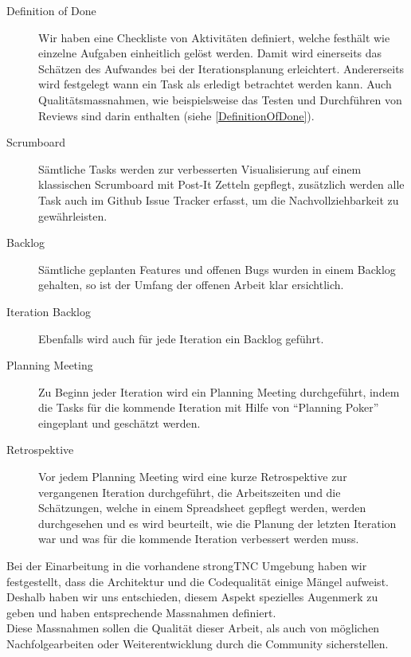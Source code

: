 \begin{description}
	\item[Definition of Done] Wir haben eine Checkliste von Aktivitäten	definiert,
	welche festhält wie einzelne Aufgaben einheitlich gelöst werden. Damit wird
	einerseits das Schätzen des Aufwandes bei der Iterationsplanung erleichtert.
	Andererseits wird festgelegt wann ein Task als erledigt betrachtet werden kann.
	Auch Qualitätsmassnahmen, wie beispielsweise das Testen und Durchführen von
	Reviews sind darin enthalten (siehe \autoref{DefinitionOfDone}).

	\item[Scrumboard] Sämtliche Tasks werden zur verbesserten Visualisierung auf
	einem klassischen Scrumboard mit Post-It Zetteln gepflegt, zusätzlich werden
	alle Task auch im Github Issue Tracker erfasst, um die Nachvollziehbarkeit
	zu gewährleisten.
	
	\item[Backlog] Sämtliche geplanten Features und offenen Bugs wurden in einem
	Backlog gehalten, so ist der Umfang der offenen Arbeit klar ersichtlich.
	
	\item[Iteration Backlog] Ebenfalls wird auch für jede Iteration ein Backlog
	geführt.
	
	\item[Planning Meeting] Zu Beginn jeder Iteration wird ein Planning Meeting
	durchgeführt, indem die Tasks für die kommende Iteration mit Hilfe von
	\enquote{Planning Poker} eingeplant und geschätzt werden.
		
	\item[Retrospektive] Vor jedem Planning Meeting wird eine kurze Retrospektive
	zur vergangenen Iteration durchgeführt, die Arbeitszeiten und die Schätzungen,
	welche in einem Spreadsheet gepflegt werden, werden durchgesehen und es wird
	beurteilt, wie die Planung der letzten Iteration war und was für die kommende
	Iteration verbessert werden muss.
	
\end{description}

Bei der Einarbeitung in die vorhandene strongTNC Umgebung haben wir
festgestellt, dass die Architektur und die Codequalität einige Mängel aufweist.
Deshalb haben wir uns entschieden, diesem Aspekt spezielles Augenmerk zu geben
und haben entsprechende Massnahmen definiert.\\ 
Diese Massnahmen sollen die Qualität dieser Arbeit, als auch von möglichen
Nachfolgearbeiten oder Weiterentwicklung durch die Community sicherstellen.

